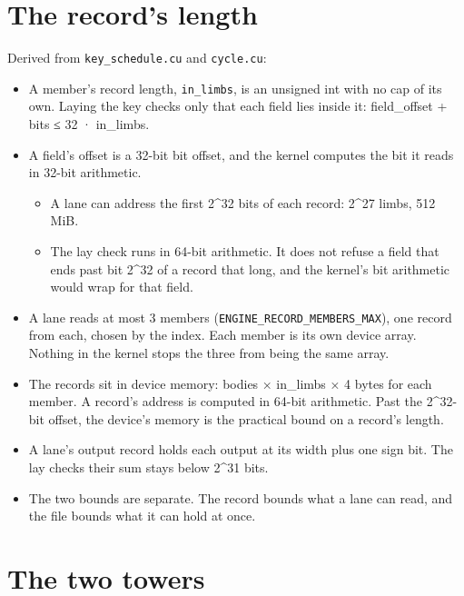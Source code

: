 \section{\texorpdfstring{The record's length}{The record's length}}

Derived from \texttt{key\_\allowbreak{}schedule.\allowbreak{}cu} and \texttt{cycle.\allowbreak{}cu}:

\begin{itemize}
\item A member's record length, \texttt{in\_\allowbreak{}limbs}, is an unsigned int with no cap of its own. Laying the key checks only that each field lies inside it: field\_\allowbreak{}offset + bits ≤ 32 · in\_\allowbreak{}limbs.
\item A field's offset is a 32-bit bit offset, and the kernel computes the bit it reads in 32-bit arithmetic.

\begin{itemize}
\item A lane can address the first 2\textasciicircum{}32 bits of each record: 2\textasciicircum{}27 limbs, 512 MiB.
\item The lay check runs in 64-bit arithmetic. It does not refuse a field that ends past bit 2\textasciicircum{}32 of a record that long, and the kernel's bit arithmetic would wrap for that field.
\end{itemize}
\item A lane reads at most 3 members (\texttt{ENGINE\_\allowbreak{}RECORD\_\allowbreak{}MEMBERS\_\allowbreak{}MAX}), one record from each, chosen by the index. Each member is its own device array. Nothing in the kernel stops the three from being the same array.
\item The records sit in device memory: bodies × in\_\allowbreak{}limbs × 4 bytes for each member. A record's address is computed in 64-bit arithmetic. Past the 2\textasciicircum{}32-bit offset, the device's memory is the practical bound on a record's length.
\item A lane's output record holds each output at its width plus one sign bit. The lay checks their sum stays below 2\textasciicircum{}31 bits.
\item The two bounds are separate. The record bounds what a lane can read, and the file bounds what it can hold at once.
\end{itemize}

\section{\texorpdfstring{The two towers}{The two towers}}

